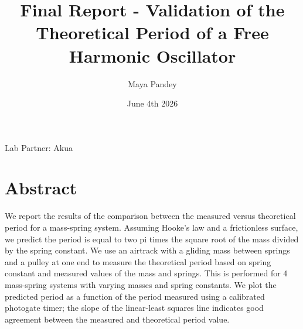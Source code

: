 \documentclass[11pt]{article}
\title{Final Report - Validation of the Theoretical Period of a Free Harmonic Oscillator}
\author{Maya Pandey}
\date{June 4th 2026}
\begin{document}
\maketitle
\begin{center}
{\large Lab Partner: Akua}
\end{center}

\clearpage
\section{Abstract}
{
We report the results of the comparison between the measured versus theoretical period for a mass-spring system. Assuming Hooke's law and a frictionless surface, we predict the period is equal to two pi times the square root of the mass divided by the spring constant. We use an airtrack with a gliding mass between springs and a pulley at one end to measure the theoretical period based on spring constant and measured values of the mass and springs. This is performed for 4 mass-spring systems with varying masses and spring constants. We plot the predicted period as a function of the period measured using a calibrated photogate timer; the slope of the linear-least squares line indicates good agreement between the measured and theoretical period value.
}
\end{document}
